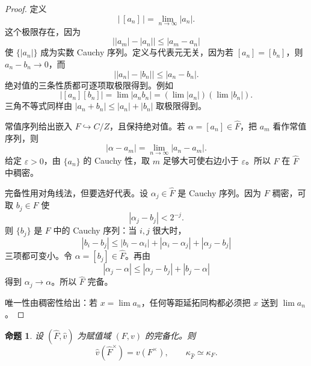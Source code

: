 \documentclass[11pt,a4paper,openany]{ctexbook}
\numberwithin{equation}{chapter}
\theoremstyle{plain}
\newtheorem{proposition}[theorem]{命题}
\theoremstyle{definition}
\theoremstyle{remark}
\begin{document}
\begin{proof}
定义
\[
\left|\,[a_n]\,\right|=\lim_{n\to\infty}|a_n|.
\]
这个极限存在，因为
\[
\bigl||a_m|-|a_n|\bigr|\le |a_m-a_n|
\]
使 $\{|a_n|\}$ 成为实数 Cauchy 序列。定义与代表元无关，因为若
$[a_n]=[b_n]$，则 $a_n-b_n\to0$，而
\[
\bigl||a_n|-|b_n|\bigr|\le |a_n-b_n|.
\]
绝对值的三条性质都可逐项取极限得到。例如
\[
|[a_n][b_n]|=\lim |a_nb_n|
=\left(\lim |a_n|\right)\left(\lim |b_n|\right).
\]
三角不等式同样由
$|a_n+b_n|\le |a_n|+|b_n|$ 取极限得到。

常值序列给出嵌入 $F\hookrightarrow C/Z$，且保持绝对值。若
$\alpha=[a_n]\in\widehat F$，把 $a_m$ 看作常值序列，则
\[
|\alpha-a_m|=\lim_{n\to\infty}|a_n-a_m|.
\]
给定 $\varepsilon>0$，由 $\{a_n\}$ 的 Cauchy 性，取 $m$ 足够大可使右边小于
$\varepsilon$。所以 $F$ 在 $\widehat F$ 中稠密。

完备性用对角线法，但要选好代表。设 $\alpha_j\in\widehat F$ 是 Cauchy 序列。因为 $F$ 稠密，可取 $b_j\in F$ 使
\[
|\alpha_j-b_j|<2^{-j}.
\]
则 $\{b_j\}$ 是 $F$ 中的 Cauchy 序列：当 $i,j$ 很大时，
\[
|b_i-b_j|\le |b_i-\alpha_i|+|\alpha_i-\alpha_j|+|\alpha_j-b_j|
\]
三项都可变小。令 $\alpha=[b_j]\in\widehat F$。再由
\[
|\alpha_j-\alpha|\le |\alpha_j-b_j|+|b_j-\alpha|
\]
得到 $\alpha_j\to\alpha$。所以 $\widehat F$ 完备。

唯一性由稠密性给出：若 $x=\lim a_n$，任何等距延拓同构都必须把 $x$ 送到 $\lim a_n$。
\end{proof}

\begin{proposition}
设 $(\widehat F,\widehat v)$ 为赋值域 $(F,v)$ 的完备化。则
\[
\widehat v(\widehat F^\times)=v(F^\times),
\qquad
\kappa_{\widehat F}\simeq\kappa_F.
\]
\end{proposition}
\end{document}

